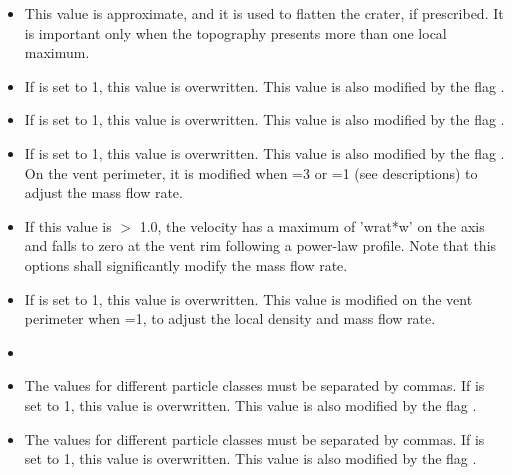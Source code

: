 \begin{itemize}
\item
{}
{This value is approximate, and it is used to flatten the crater, if prescribed. It is important only when the topography presents more than one local maximum.}

\item
{}
{If  is set to 1, this value is overwritten. This value
is also modified by the flag .}

\item
{}
{If  is set to 1, this value is overwritten. This value
is also modified by the flag .}

\item
{}
{If  is set to 1, this value is overwritten. This value
is also modified by the flag . On the vent perimeter,
it is modified when =3 or =1 (see descriptions)
to adjust the mass flow rate.}

\item
{}
{If this value is $>$ 1.0, the velocity has a maximum of 'wrat*w' on the axis and falls to zero at the vent rim
following a power-law profile. Note that this options shall significantly modify the mass flow rate.}

\item
{}
{If  is set to 1, this value is overwritten. 
This value is modified on the vent perimeter when =1,
to adjust the local density and mass flow rate.}

\item
{}

\item
{}
{The values for different particle classes must be separated by commas.
If  is set to 1, this value is overwritten. This value
is also modified by the flag .}

\item
{}
{The values for different particle classes must be separated by commas.
If  is set to 1, this value is overwritten. This value
is also modified by the flag .}


\end{itemize}
